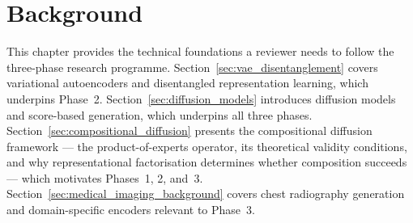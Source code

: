 
\chapter{Background}
\label{chap:background}

This chapter provides the technical foundations a reviewer needs to follow the three-phase
research programme. Section~\ref{sec:vae_disentanglement} covers variational autoencoders
and disentangled representation learning, which underpins Phase~2. Section~\ref{sec:diffusion_models}
introduces diffusion models and score-based generation, which underpins all three phases.
Section~\ref{sec:compositional_diffusion} presents the compositional diffusion framework ---
the product-of-experts operator, its theoretical validity conditions, and why representational
factorisation determines whether composition succeeds --- which motivates Phases~1, 2, and~3.
Section~\ref{sec:medical_imaging_background} covers chest radiography generation and
domain-specific encoders relevant to Phase~3.





